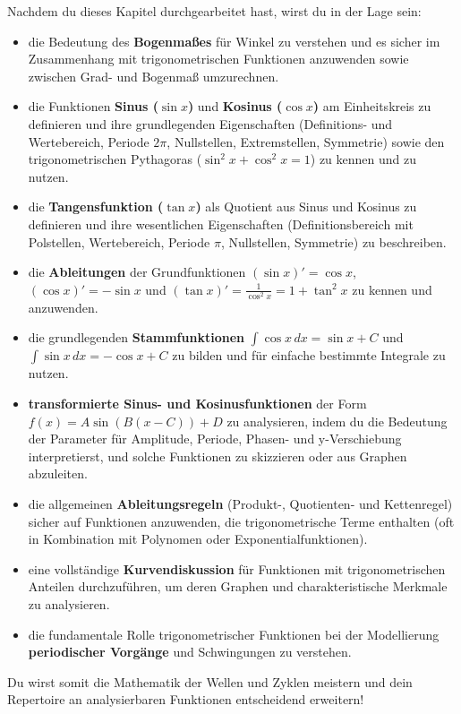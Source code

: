 \begin{tcolorbox}[colback=blue!5!white, colframe=blue!75!black, title=Was du in diesem Kapitel lernen wirst:]
Nachdem du dieses Kapitel durchgearbeitet hast, wirst du in der Lage sein:
\begin{itemize}[noitemsep, topsep=0pt, leftmargin=*, itemsep=2pt]
    \item die Bedeutung des \textbf{Bogenmaßes} für Winkel zu verstehen und es sicher im Zusammenhang mit trigonometrischen Funktionen anzuwenden sowie zwischen Grad- und Bogenmaß umzurechnen.
    \item die Funktionen \textbf{Sinus ($\sin x$)} und \textbf{Kosinus ($\cos x$)} am Einheitskreis zu definieren und ihre grundlegenden Eigenschaften (Definitions- und Wertebereich, Periode $2\pi$, Nullstellen, Extremstellen, Symmetrie) sowie den trigonometrischen Pythagoras ($\sin^2x + \cos^2x = 1$) zu kennen und zu nutzen.
    \item die \textbf{Tangensfunktion ($\tan x$)} als Quotient aus Sinus und Kosinus zu definieren und ihre wesentlichen Eigenschaften (Definitionsbereich mit Polstellen, Wertebereich, Periode $\pi$, Nullstellen, Symmetrie) zu beschreiben.
    \item die \textbf{Ableitungen} der Grundfunktionen $(\sin x)' = \cos x$, $(\cos x)' = -\sin x$ und $(\tan x)' = \frac{1}{\cos^2 x} = 1+\tan^2x$ zu kennen und anzuwenden.
    \item die grundlegenden \textbf{Stammfunktionen} $\int \cos x \,dx = \sin x + C$ und $\int \sin x \,dx = -\cos x + C$ zu bilden und für einfache bestimmte Integrale zu nutzen.
    \item \textbf{transformierte Sinus- und Kosinusfunktionen} der Form $f(x) = A \sin(B(x-C)) + D$ zu analysieren, indem du die Bedeutung der Parameter für Amplitude, Periode, Phasen- und y-Verschiebung interpretierst, und solche Funktionen zu skizzieren oder aus Graphen abzuleiten.
    \item die allgemeinen \textbf{Ableitungsregeln} (Produkt-, Quotienten- und Kettenregel) sicher auf Funktionen anzuwenden, die trigonometrische Terme enthalten (oft in Kombination mit Polynomen oder Exponentialfunktionen).
    \item eine vollständige \textbf{Kurvendiskussion} für Funktionen mit trigonometrischen Anteilen durchzuführen, um deren Graphen und charakteristische Merkmale zu analysieren.
    \item die fundamentale Rolle trigonometrischer Funktionen bei der Modellierung \textbf{periodischer Vorgänge} und Schwingungen zu verstehen.
\end{itemize}
Du wirst somit die Mathematik der Wellen und Zyklen meistern und dein Repertoire an analysierbaren Funktionen entscheidend erweitern!
\end{tcolorbox}
\bigskip

